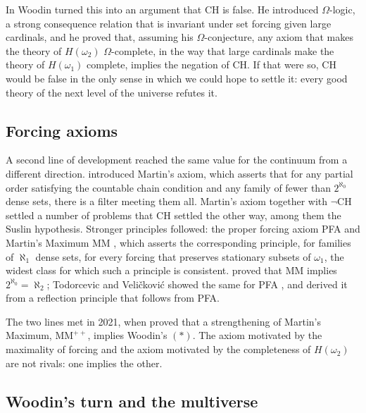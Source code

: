 \documentclass{situationist-preprint}
\begin{document}
In \citet{Woodin2001a,Woodin2001b} Woodin turned this into an argument that CH is false. He introduced $\Omega$-logic, a strong consequence relation that is invariant under set forcing given large cardinals, and he proved that, assuming his $\Omega$-conjecture, any axiom that makes the theory of $H(\omega_2)$ $\Omega$-complete, in the way that large cardinals make the theory of $H(\omega_1)$ complete, implies the negation of CH. If that were so, CH would be false in the only sense in which we could hope to settle it: every good theory of the next level of the universe refutes it.

\subsection{Forcing axioms}

A second line of development reached the same value for the continuum from a different direction. \citet{MartinSolovay1970} introduced Martin's axiom, which asserts that for any partial order satisfying the countable chain condition and any family of fewer than $2^{\aleph_0}$ dense sets, there is a filter meeting them all. Martin's axiom together with $\neg$CH settled a number of problems that CH settled the other way, among them the Suslin hypothesis. Stronger principles followed: the proper forcing axiom PFA \citep{Baumgartner1984} and Martin's Maximum MM \citep{FMS1988}, which asserts the corresponding principle, for families of $\aleph_1$ dense sets, for every forcing that preserves stationary subsets of $\omega_1$, the widest class for which such a principle is consistent. \citet{FMS1988} proved that MM implies $2^{\aleph_0} = \aleph_2$; Todorcevic and Veličković showed the same for PFA \citep{Velickovic1992}, and \citet{Moore2005} derived it from a reflection principle that follows from PFA.

The two lines met in 2021, when \citet{AsperoSchindler2021} proved that a strengthening of Martin's Maximum, $\mathrm{MM}^{++}$, implies Woodin's $(*)$. The axiom motivated by the maximality of forcing and the axiom motivated by the completeness of $H(\omega_2)$ are not rivals: one implies the other.

\subsection{Woodin's turn and the multiverse}
\end{document}
